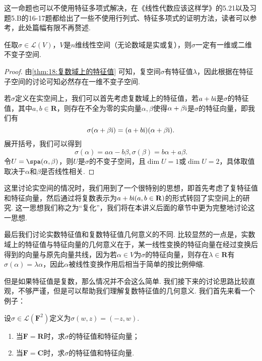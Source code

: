 这一命题也可以不使用特征多项式解决，在《线性代数应该这样学》的5.21以及习题5.B的16-17题都给出了一些不使用行列式、特征多项式的证明方法，读者可以参考，此处篇幅有限不再赘述.

\begin{theorem}\label{thm:18:特征值与不变子空间}
    任取$\sigma\in \mathcal{L}(V)$，$V$是$n$维线性空间（无论数域是实或复），则$\sigma$一定有一维或二维不变子空间.
\end{theorem}

\begin{proof}
    由\autoref{thm:18:复数域上的特征值} 可知，复空间$\sigma$有特征值$\lambda$，因此根据在特征子空间的讨论可知必然存在一维不变子空间.

    若$\sigma$定义在实空间上，我们可以首先考虑复数域上的特征值，若$a+b\textup{i}$是$\sigma$的特征值，其中$a,b\in\mathbf{R}$，则存在不全为零的实向量$\alpha,\beta$使得$\alpha+\beta\textup{i}$是$\sigma$的特征向量，即我们有
    \[\sigma(\alpha+\beta\textup{i})=(a+b\textup{i})(\alpha+\beta\textup{i}).\]
    展开括号，我们可以得到
    \[\sigma(\alpha)=a\alpha-b\beta,\sigma(\beta)=b\alpha+a\beta.\]
    令$U=\spa(\alpha,\beta)$，则$U$是$\sigma$的不变子空间，且$\dim U=1$或$\dim U=2$，具体取值取决于$\alpha$和$\beta$是否线性相关.
\end{proof}

这里讨论实空间的情况时，我们用到了一个很特别的思想，即首先考虑了复特征值和特征向量，然后通过将复数表示为$a+b\textup{i}(a,b\in\mathbf{R})$的形式转回了实空间上的研究. 这一思想我们称之为``复化''，我们将在本讲义后面的章节中更为完整地讨论这一思想.

最后我们讨论实数特征值和复数特征值几何意义的不同. 比较显然的一点是，实数域上的特征值与特征向量的几何意义在于，某一线性变换的特征向量在经过变换后得到的向量与原先向量共线，因为若$\alpha\in V$为$\sigma$的特征向量，则存在$\lambda\in\mathbf{R}$有$\sigma(\alpha)=\lambda\alpha$，因此$\alpha$被线性变换作用后相当于简单的按比例伸缩.

但是如果特征值是复数，那么情况并不会这么简单. 我们接下来的讨论思路比较直观，不够严谨，但是可以帮助我们理解复数特征值的几何意义. 我们首先来看一个例子：
\begin{example}
    设$\sigma\in\mathcal{L}(\mathbf{F}^2)$定义为$\sigma(w,z)=(-z,w)$.
    \begin{enumerate}
        \item 当$\mathbf{F}=\mathbf{R}$时，求$\sigma$的特征值和特征向量；

        \item 当$\mathbf{F}=\mathbf{C}$时，求$\sigma$的特征值和特征向量.
    \end{enumerate}
\end{example}

